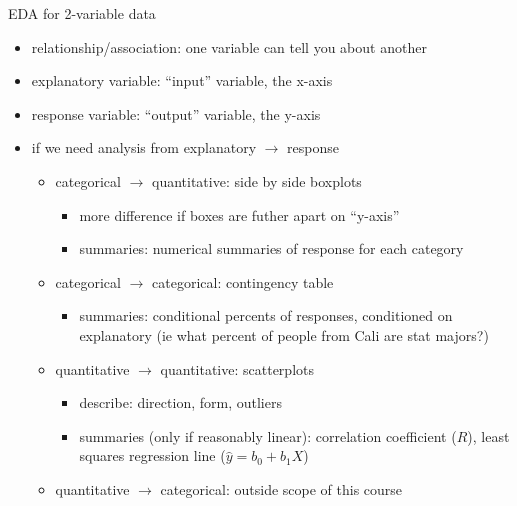 \documentclass[11pt]{article}
\begin{document}
\newpage
EDA for 2-variable data
\begin{itemize}
  \item relationship/association: one variable can tell you about another
  \item explanatory variable: ``input'' variable, the x-axis
  \item response variable: ``output'' variable, the y-axis
  \item if we need analysis from explanatory $\rightarrow$ response
  \begin{itemize}
    \item categorical $\rightarrow$ quantitative: side by side boxplots
    \begin{itemize}
      \item more difference if boxes are futher apart on ``y-axis''
      \item summaries: numerical summaries of response for each category
    \end{itemize}
    \item categorical $\rightarrow$ categorical: contingency table
    \begin{itemize}
      \item summaries: conditional percents of responses, conditioned on explanatory (ie what percent of people from Cali are stat majors?)
    \end{itemize}
    \item quantitative $\rightarrow$ quantitative: scatterplots
    \begin{itemize}
      \item describe: direction, form, outliers
      \item summaries (only if reasonably linear): correlation coefficient ($R$), least squares regression line ($\hat{y} = b_0 + b_1X$)
    \end{itemize}
    \item quantitative $\rightarrow$ categorical: outside scope of this course 
  \end{itemize}
\end{itemize}
\end{document}
